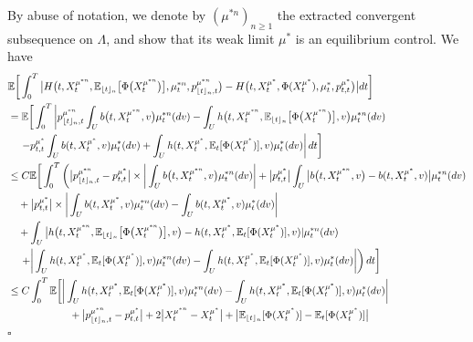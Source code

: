 \documentclass[12pt]{article}
\DeclarePairedDelimiter\floor{\lfloor}{\rfloor}
\theoremstyle{named}
\numberwithin{equation}{section}
\newenvironment{Proof}{\removelastskip\par\medskip \noindent{\em Proof.} \rm}{\penalty-20\null\hfill$\square$\par\medbreak}
\begin{document}
\begin{Proof}
  By abuse of notation, we denote by $(\mu^{*n} )_{{n}\geq 1}$ the extracted convergent subsequence on $\Lambda$, and show that its weak limit $\mu^*$ is an equilibrium control.
 We have
\begin{align}
  &\mathbb{E}\bigg[\int_0^T\big| H\bigl(t,X^{\mu^{*n} }_t,\mathbb{E}_{\floor{t}_{n}}\big[\Phi\big(X^{\mu^{*n} }_t\big)\big],\mu^{*n} _t,p^{\mu^{*n} }_{\floor{t}_{n},t}\bigr) - H\bigl(t,X^{\mu^*}_t,\Phi(X^{\mu^*}_t),\mu^*_t,p^{\mu^*}_{t,t}\bigr)\big| dt\bigg]  \nonumber\\
  &= \mathbb{E}\bigg[\int_0^T\left|
    p^{\mu^{*n} }_{\floor{t}_{n},t}\int_U b\big(t,X^{\mu^{*n} }_t,v\big) \mu^{*n} _t(dv)  - \int_U h\big(t,X^{\mu^{*n} }_t,\mathbb{E}_{\floor{t}_{n}}\big[\Phi\big(X^{\mu^{*n} }_t\big)\big], v\big) \mu^{*n} _t(dv)
    \right.
    \nonumber\\
    & \quad
    \left.\left.
    - p^{\mu^*}_{t,t}\int_U b(t,X^{\mu^*}_t,v) \mu^*_t(dv)  + \int_U h(t,X^{\mu^*}_t,\mathbb{E}_t[\Phi(X^{\mu^*}_t)], v) \mu^*_t(dv)\right| dt\right]
  \nonumber\\
  &\leq C \mathbb{E}\bigg[\int_0^T \bigg(
    \bigl|
    p^{\mu^{*n} }_{\floor{t}_{n},t}-p^{\mu^*}_{t,t}\bigr| \times
   \bigg| \int_U b\big(t,X^{\mu^{*n} }_t,v\big) \mu^{*n} _t(dv)\biggr|
 + \big|p^{\mu^*}_{t,t}\big|  \int_U \big| b\big(t,X^{\mu^{*n} }_t,v\big)-b(t,X^{\mu^*}_t,v) \big| \mu^{*n} _t(dv) \nonumber\\
& \quad + \big|p^{\mu^*}_{t,t}\big| \times \bigg| \int_U b(t,X^{\mu^*}_t,v) \mu^{*n} _t(dv)  - \int_U b(t,X^{\mu^*}_t,v) \mu^*_t(dv) \bigg| \nonumber\\
& \quad +  \int_U \big| h\big(t,X^{\mu^{*n} }_t,\mathbb{E}_{\floor{t}_{n}}\big[\Phi\big(X^{\mu^{*n} }_t\big)\big], v\big) - h(t,X^{\mu^*}_t,\mathbb{E}_t[\Phi(X^{\mu^*}_t)], v)| \mu^{*n} _t(dv)  \nonumber\\
    &\left.\left.
     \quad + \bigg| \int_U h(t,X^{\mu^*}_t,\mathbb{E}_t[\Phi(X^{\mu^*}_t)], v) \mu^{*n} _t(dv) - \int_U h(t,X^{\mu^*}_t,\mathbb{E}_t[\Phi(X^{\mu^*}_t)], v) \mu^*_t(dv) \bigg| \right)
    dt\right] \nonumber\\
  &\leq C \int_0^T \mathbb{E} \biggl[\bigg| \int_U h(t,X^{\mu^*}_t,\mathbb{E}_t[\Phi(X^{\mu^*}_t)], v) \mu^{*n} _t(dv) - \int_U h(t,X^{\mu^*}_t,\mathbb{E}_t[\Phi(X^{\mu^*}_t)], v) \mu^*_t(dv) \bigg| \label{main theorem last inequality-0}\\
    & \quad \quad \quad \quad \quad \quad
    + \big|p^{\mu^{*n} }_{\floor{t}_{n},t} - p^{\mu^*}_{t,t}\big| + 2 \big| X^{\mu^{*n} }_t - X^{\mu^*}_t\big|
    + \big|\mathbb{E}_{\floor{t}_{n}}[\Phi(X^{\mu^*}_t)]-\mathbb{E}_t[\Phi(X^{\mu^*}_t)]\big|

\end{align}
\end{Proof}
\end{document}
